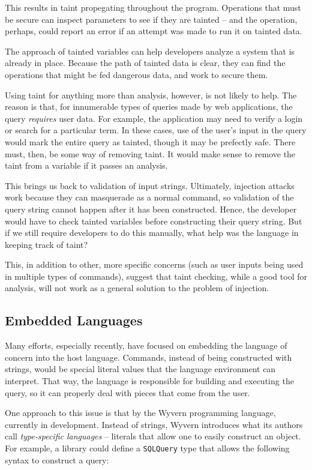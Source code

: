 \documentclass[twocolumn]{article}
\begin{document}
This results in taint propegating throughout the program.  Operations that must be secure can inspect parameters to see if they are tainted -- and the operation, perhaps, could report an error if an attempt was made to run it on tainted data.

The approach of tainted variables can help developers analyze a system that is already in place.  Because the path of tainted data is clear, they can find the operations that might be fed dangerous data, and work to secure them.

Using taint for anything more than analysis, however, is not likely to help.  The reason is that, for innumerable types of queries made by web applications, the query \textit{requires} user data.  For example, the application may need to verify a login or search for a particular term.  In these cases, use of the user's input in the query would mark the entire query as tainted, though it may be prefectly safe.  There must, then, be some way of removing taint.  It would make sense to remove the taint from a variable if it passes an analysis.

This brings us back to validation of input strings. Ultimately, injection attacks work because they can masquerade as a normal command, so validation of the query string cannot happen after it has been constructed.  Hence, the developer would have to check tainted variables before constructing their query string.  But if we still require developers to do this manually, what help was the language in keeping track of taint?   

This, in addition to other, more specific concerns (such as user inputs being used in multiple types of commands), suggest that taint checking, while a good tool for analysis, will not work as a general solution to the problem of injection.

\subsection{Embedded Languages}
Many efforts, especially recently, have focused on embedding the language of concern into the host language.  Commands, instead of being constructed with strings, would be special literal values that the language environment can interpret.  That way, the language is responsible for building and executing the query, so it can properly deal with pieces that come from the user.

One approach to this issue is that by the Wyvern programming language, currently in development.\cite{wyvern-short}  Instead of strings, Wyvern introduces what its authors call \textit{type-specific languages} -- literals that allow one to easily construct an object.\cite{wyvern-long}  For example, a library could define a \verb;SQLQuery; type that allows the following syntax to construct a query:
\end{document}
